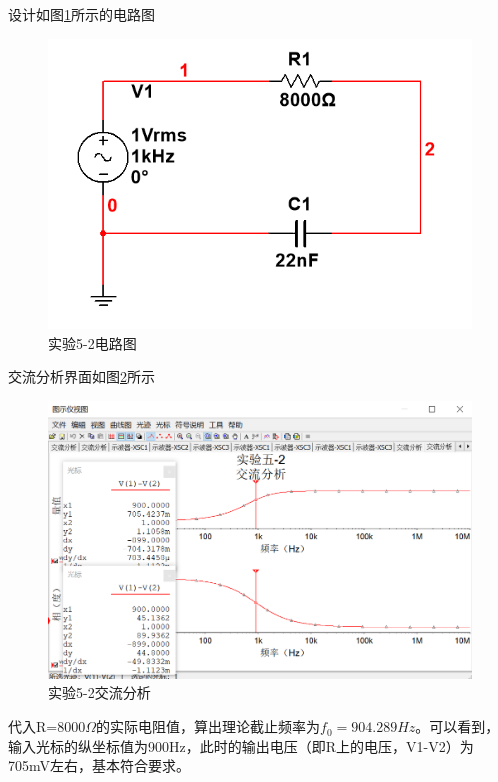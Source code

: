 \documentclass{ctexart}
\begin{document}
设计如图\ref{fig:实验5-2电路图}所示的电路图
\begin{figure}[ht]
    \centering
    \includegraphics[scale=0.5]{pic/实验5-2电路图.png}
    \caption{实验5-2电路图}
    \label{fig:实验5-2电路图}
\end{figure}
交流分析界面如图\ref{fig:实验5-22交流分析}所示
\begin{figure}[ht]
    \centering
    \includegraphics[scale=0.5]{pic/实验5-2,相频特性.png}
    \caption{实验5-2交流分析}
    \label{fig:实验5-22交流分析}
\end{figure}
代入R=8000$\Omega$的实际电阻值，算出理论截止频率为$f_0=904.289Hz$。可以看到，输入光标的纵坐标值为900Hz，此时的输出电压（即R上的电压，V1-V2）为705mV左右，基本符合要求。
\end{document}
